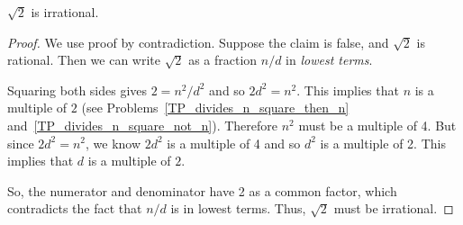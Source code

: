 \begin{theorem}\label{thm:sqrt2irr_by_contra}
$\sqrt{2}$ is irrational.
\end{theorem}

\begin{proof}
We use proof by contradiction.  Suppose the claim is false, and
$\sqrt{2}$ is rational.  Then we can write $\sqrt{2}$ as a fraction
$n/d$ in \textit{lowest terms}.

Squaring both sides gives $2 = n^2 / d^2$ and so $2 d^2 = n^2$.  This
implies that $n$ is a multiple of $2$ (see
Problems~\ref{TP_divides_n_square_then_n}
and~\ref{TP_divides_n_square_not_n}).  Therefore $n^2$ must be a
multiple of 4.  But since $2d^2 = n^2$, we know $2 d^2$ is a multiple
of 4 and so $d^2$ is a multiple of 2.  This implies that $d$ is a
multiple of $2$.

So, the numerator and denominator have 2 as a common factor, which
contradicts the fact that $n/d$ is in lowest terms. Thus, $\sqrt{2}$ must be
irrational.
\end{proof}

